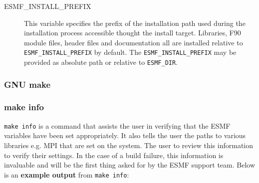 \begin{description}
\item[ESMF\_INSTALL\_PREFIX]
This variable specifies the prefix of the installation path used during the
installation process accessible thought the install target. Libraries, F90
module files, header files and documentation all are installed relative to
{\tt ESMF\_INSTALL\_PREFIX} by default. The {\tt ESMF\_INSTALL\_PREFIX} may be
provided as absolute path or relative to {\tt ESMF\_DIR}.

\end{description}


\subsubsection{GNU make}


\subsubsection{make info}
{\tt make info} is a command that assists the user in verifying that the ESMF 
variables have been set appropriately. It also tells the user the paths to 
various libraries e.g. MPI that are set on the system. The user to review 
this information to verify their settings. In the case of a build failure, 
this information is invaluable and will be the first thing asked for by the
ESMF support team. Below is an {\bf example output} from {\tt make info}: 
 
